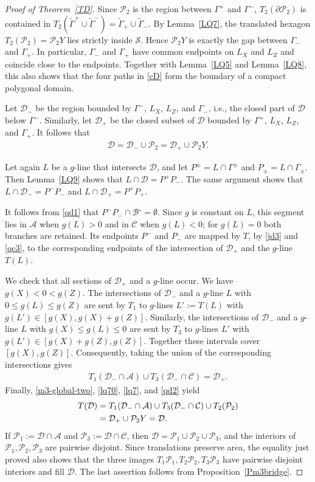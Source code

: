 \documentclass[11pt,reqno,tbtags,a4paper]{amsart}
\numberwithin{equation}{section}
\renewcommand\le{\leq}
\renewcommand\leq{\leqslant}
\theoremstyle{plain}%
\theoremstyle{definition}
\theoremstyle{remark}
\newcommand{\refT}[1]{Theorem~\ref{#1}}
\newcommand{\refL}[1]{Lemma~\ref{#1}}
\newcounter{cc}
\newcommand\inter{\ensuremath{^\circ}}
\newcommand\gG{\Gamma}
\newcommand\cA{\mathcal A}
\newcommand\cB{\mathcal B}
\newcommand\cC{\mathcal C}
\newcommand\cD{\mathcal D}
\newcommand\cP{\mathcal P}
\newcommand\cS{{\mathcal S}}
\newcommand\tgG{\widetilde{\gG}}
\newcommand\0{{\boldsymbol 0}}
\newcommand\1{{\boldsymbol 1}}
\begin{document}
\begin{proof}[Proof of \refT{TD}]
Since $\cP_2$ is the region between $\gG^+$ and $\gG^-$, 
$T_2(\partial\cP_2)$ is contained in 
$T_2(\tgG^+\cup\tgG^-)=
\tgG_+\cup\tgG_-$.  
%
%
By \refL{LQ7}, the
translated hexagon $T_2(\cP_2)=\cP_2Y$ lies strictly inside $\cS$.  
Hence $\cP_2Y$ is
exactly the gap between $\gG_-$ and $\gG_+$.  In particular,
$\gG_-$ and $\gG_+$ have common endpoints on $L_X$ and $L_Z$ and coincide
close to the endpoints.
Together with \refL{LQ5} and \refL{LQ8}, this also shows that the four paths
in \eqref{cD} form the boundary of a compact polygonal domain.

Let $\cD_-$ be the region bounded by $\gG^-$, $L_X$, $L_Z$, and $\gG_-$,
i.e., the closed part of $\cD$ below $\gG^-$. 
Similarly, let $\cD_+$ be the closed subset of $\cD$ 
bounded by $\gG^+$, $L_X$, $L_Z$, and $\gG_+$. 
It follows that
\begin{align}\label{m3-global-two}
 \cD=\cD_-\cup\cP_2=\cD_+\cup\cP_2Y.
\end{align}

Let again $L$ be a $g$-line that intersects $\cD$,
and let 
$P^\pm=L\cap\gG^\pm$ and
$P_\pm=L\cap\gG_\pm$.
Then \refL{LQ9} shows that $L\cap\cD=P^+P_-$.
The same argument shows that 
$L\cap\cD_-=P^-P_-$
and
$L\cap\cD_+=P^+P_+$.

It follows from \eqref{qd1} that $P^-P_-\cap\cB\inter=\emptyset$.  Since
$g$ is constant on $L$, this segment lies in $\cA$ when $g(L)>0$ and in
$\cC$ when $g(L)<0$; for $g(L)=0$ both branches are retained.  Its endpoints
$P^-$ and $P_-$
are mapped by $T$, by \eqref{jd3} and \eqref{qc3}, to the corresponding
endpoints of the intersection of $\cD_+$ and the $g$-line $T(L)$.

We check that all sections of $\cD_+$ and a $g$-line occur.  
We have $g(X)<0<g(Z)$.  
The intersections of $\cD_-$ and a $g$-line $L$
with $0\le g(L)\le g(Z)$  are sent by
$T_1$ to $g$-lines $L':=T(L)$
with  $g(L')\in[g(X),g(X)+g(Z)]$.  
Similarly, the
intersections of $\cD_-$ and a $g$-line $L$
with $g(X)\le g(L)\le0$ are sent by $T_3$ to $g$-lines
$L'$
with  $g(L')\in[g(X)+g(Z),g(Z)]$.  
Together these intervals cover
$[g(X),g(Z)]$.  
Consequently, taking the union of the corresponding intersections gives
\begin{align}\label{qd2}
 T_1(\cD_-\cap\cA)\cup T_3(\cD_-\cap\cC)=\cD_+.
\end{align}
Finally, \eqref{m3-global-two}, \eqref{lq70}, \eqref{lq7}, and \eqref{qd2} yield
\begin{align}
  T(\cD)
&=T_1(\cD_-\cap\cA)\cup T_3(\cD_-\cap\cC)\cup T_2(\cP_2)
\notag\\&
=\cD_+\cup\cP_2Y=\cD.
\end{align}
If $\cP_1:=\cD\cap\cA$ and $\cP_3:=\cD\cap\cC$, then
$\cD=\cP_1\cup\cP_2\cup\cP_3$, and  the interiors of $\cP_1,\cP_2,\cP_3$
are pairwise disjoint.
Since translations preserve area, the equality just proved also shows that
the three images $T_1\cP_1,T_2\cP_2,T_3\cP_3$ have pairwise disjoint interiors
and fill $\cD$.
The last assertion follows from Proposition~\ref{Pm3bridge}.
\end{proof}
\end{document}
